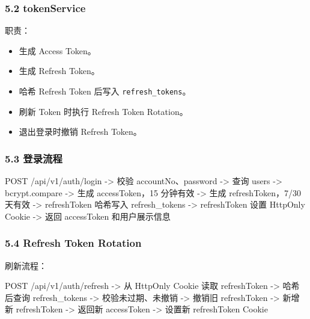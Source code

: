\documentclass[
  a4paper,
  UTF8]{ctexart}
\newenvironment{Shaded}{}{}
\newcommand{\NormalTok}[1]{#1}
\providecommand{\tightlist}{%
  \setlength{\itemsep}{0pt}\setlength{\parskip}{0pt}}
\begin{document}
\hypertarget{tokenservice}{%
\subsubsection{5.2 tokenService}\label{tokenservice}}

职责：

\begin{itemize}
\tightlist
\item
  生成 Access Token。
\item
  生成 Refresh Token。
\item
  哈希 Refresh Token 后写入 \texttt{refresh\_tokens}。
\item
  刷新 Token 时执行 Refresh Token Rotation。
\item
  退出登录时撤销 Refresh Token。
\end{itemize}

\hypertarget{ux767bux5f55ux6d41ux7a0b}{%
\subsubsection{5.3 登录流程}\label{ux767bux5f55ux6d41ux7a0b}}

\begin{Shaded}
\begin{Highlighting}[]
\NormalTok{POST /api/v1/auth/login}
\NormalTok{  {-}\textgreater{} 校验 accountNo、password}
\NormalTok{  {-}\textgreater{} 查询 users}
\NormalTok{  {-}\textgreater{} bcrypt.compare}
\NormalTok{  {-}\textgreater{} 生成 accessToken，15 分钟有效}
\NormalTok{  {-}\textgreater{} 生成 refreshToken，7/30 天有效}
\NormalTok{  {-}\textgreater{} refreshToken 哈希写入 refresh\_tokens}
\NormalTok{  {-}\textgreater{} refreshToken 设置 HttpOnly Cookie}
\NormalTok{  {-}\textgreater{} 返回 accessToken 和用户展示信息}
\end{Highlighting}
\end{Shaded}

\hypertarget{refresh-token-rotation}{%
\subsubsection{5.4 Refresh Token
Rotation}\label{refresh-token-rotation}}

刷新流程：

\begin{Shaded}
\begin{Highlighting}[]
\NormalTok{POST /api/v1/auth/refresh}
\NormalTok{  {-}\textgreater{} 从 HttpOnly Cookie 读取 refreshToken}
\NormalTok{  {-}\textgreater{} 哈希后查询 refresh\_tokens}
\NormalTok{  {-}\textgreater{} 校验未过期、未撤销}
\NormalTok{  {-}\textgreater{} 撤销旧 refreshToken}
\NormalTok{  {-}\textgreater{} 新增新 refreshToken}
\NormalTok{  {-}\textgreater{} 返回新 accessToken}
\NormalTok{  {-}\textgreater{} 设置新 refreshToken Cookie}
\end{Highlighting}
\end{Shaded}
\end{document}
